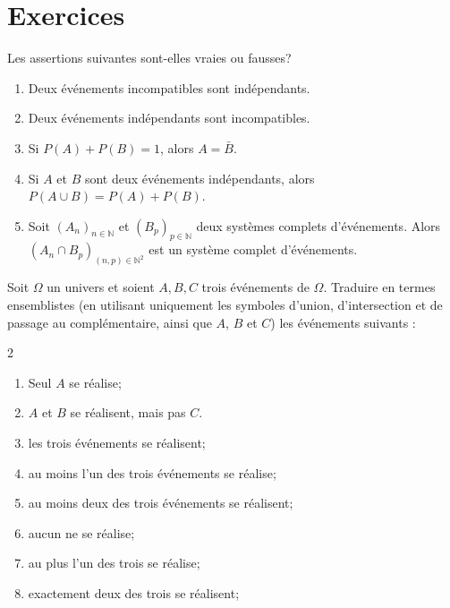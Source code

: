\documentclass[../PolyS4.tex]{subfiles}
\begin{document}
\section{Exercices}








Les assertions suivantes sont-elles vraies ou fausses?
\begin{enumerate}
\item Deux événements incompatibles sont indépendants.
\item Deux événements indépendants sont incompatibles.
\item Si $P(A)+P(B)=1$, alors $A=\bar B$.
\item Si $A$ et $B$ sont deux événements indépendants, alors $P(A\cup B)=P(A)+P(B)$.
\item Soit $(A_n)_{n\in\mathbb N}$ et $(B_p)_{p\in\mathbb N}$ deux systèmes complets d'événements. Alors $(A_n\cap B_p)_{(n,p)\in\mathbb N^2}$ est un système complet d'événements.\\
\end{enumerate}



\newpage



Soit $\Omega$ un univers et soient $A,B,C$ trois événements de $\Omega$. Traduire en termes ensemblistes
(en utilisant uniquement les symboles d'union, d'intersection et de passage au complémentaire, ainsi que $A$, $B$ 
et $C$) les événements suivants :
\begin{multicols}{2}
\begin{enumerate}
 \item Seul $A$ se réalise;
\item $A$ et $B$ se réalisent, mais pas $C$.
\item les trois événements se réalisent;
\item au moins l'un des trois événements se réalise;
\item au moins deux des trois événements se réalisent;
\item aucun ne se réalise;
\item au plus l'un des trois se réalise;
\item exactement deux des trois se réalisent;\\
\end{enumerate}

\end{multicols}
\end{document}
